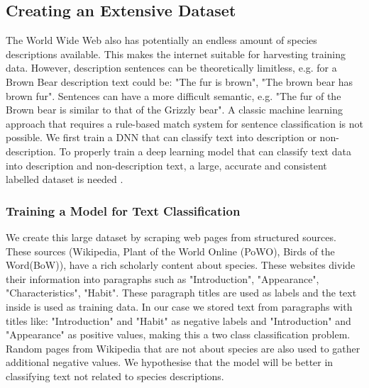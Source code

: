 \documentclass[a4paper, 12pt, oneside]{book} %
\begin{document}
\subsection{Creating an Extensive Dataset} \label{par:dataset}
The World Wide Web also has potentially an endless amount of species descriptions available.
This makes the internet suitable for harvesting training data.
However, description sentences can be theoretically limitless, e.g. for a Brown Bear description text could be: "The fur is brown", "The brown bear has brown fur".
Sentences can have a more difficult semantic, e.g. "The fur of the Brown bear is similar to that of the Grizzly bear".
A classic machine learning approach that requires a rule-based match system for sentence classification is not possible. 
We first train a DNN that can classify text into description or non-description.
To properly train a deep learning model that can classify text data into description and non-description text, a large, accurate and consistent labelled dataset is needed \autocite{munappy_data_2019}.

\subsubsection{Training a Model for Text Classification}
We create this large dataset by scraping web pages from structured sources.
These sources (Wikipedia, Plant of the World Online (PoWO), Birds of the Word(BoW)), have a rich scholarly content about species.
These websites divide their information into paragraphs such as "Introduction", "Appearance", "Characteristics", "Habit".
These paragraph titles are used as labels and the text inside is used as training data.
In our case we stored text from paragraphs with titles like:  "Introduction" and "Habit" as negative labels and "Introduction" and "Appearance" as positive values, making this a two class classification problem. 
Random pages from Wikipedia that are not about species are also used to gather additional negative values.
We hypothesise that the model will be better in classifying text not related to species descriptions.
\end{document}
